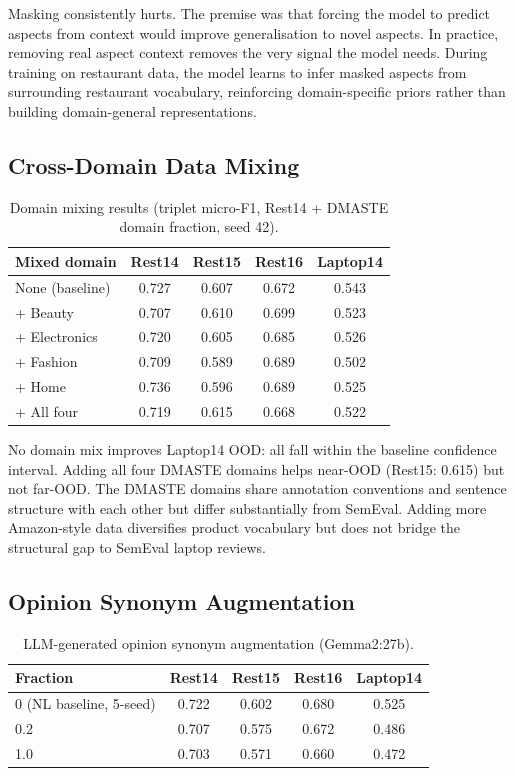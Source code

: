 \documentclass[12pt,a4paper]{report}
\begin{document}
Masking consistently hurts. The premise was that forcing the model to predict aspects from context would improve generalisation to novel aspects. In practice, removing real aspect context removes the very signal the model needs. During training on restaurant data, the model learns to infer masked aspects from surrounding restaurant vocabulary, reinforcing domain-specific priors rather than building domain-general representations.

\subsection{Cross-Domain Data Mixing}\label{sec:domainmix}

\begin{table}[H]
\centering
\caption{Domain mixing results (triplet micro-F1, Rest14 + DMASTE domain fraction, seed 42).}
\label{tab:domainmix}
\small
\begin{tabular}{@{}lcccc@{}}
\toprule
\textbf{Mixed domain} & \textbf{Rest14} & \textbf{Rest15} & \textbf{Rest16} & \textbf{Laptop14} \\
\midrule
None (baseline) & 0.727 & 0.607 & 0.672 & 0.543 \\
\midrule
+ Beauty & 0.707 & 0.610 & 0.699 & 0.523 \\
+ Electronics & 0.720 & 0.605 & 0.685 & 0.526 \\
+ Fashion & 0.709 & 0.589 & 0.689 & 0.502 \\
+ Home & 0.736 & 0.596 & 0.689 & 0.525 \\
+ All four & 0.719 & 0.615 & 0.668 & 0.522 \\
\bottomrule
\end{tabular}
\end{table}

No domain mix improves Laptop14 OOD: all fall within the baseline confidence interval. Adding all four DMASTE domains helps near-OOD (Rest15: 0.615) but not far-OOD. The DMASTE domains share annotation conventions and sentence structure with each other but differ substantially from SemEval. Adding more Amazon-style data diversifies product vocabulary but does not bridge the structural gap to SemEval laptop reviews.

\subsection{Opinion Synonym Augmentation}

\begin{table}[H]
\centering
\caption{LLM-generated opinion synonym augmentation (Gemma2:27b).}
\label{tab:opinion-aug}
\small
\begin{tabular}{@{}lcccc@{}}
\toprule
\textbf{Fraction} & \textbf{Rest14} & \textbf{Rest15} & \textbf{Rest16} & \textbf{Laptop14} \\
\midrule
0 (NL baseline, 5-seed) & 0.722 & 0.602 & 0.680 & 0.525 \\
0.2 & 0.707 & 0.575 & 0.672 & 0.486 \\
1.0 & 0.703 & 0.571 & 0.660 & 0.472 \\
\bottomrule
\end{tabular}
\end{table}
\end{document}
